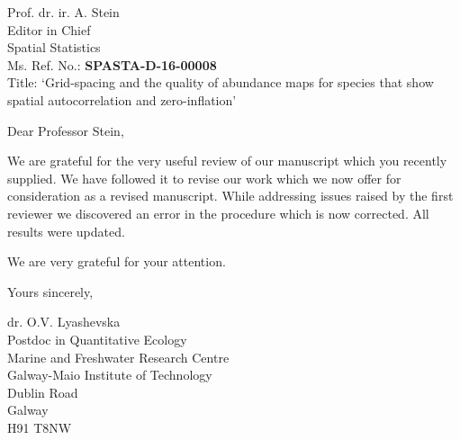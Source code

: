 \documentclass{letter}
\begin{document}
\begin{letter}{
Prof. dr. ir. A. Stein\\
Editor in Chief\\
Spatial Statistics\\
        
\vspace{1cm}
Ms. Ref. No.:  \textbf{SPASTA-D-16-00008}\\
Title: `Grid-spacing and the quality of abundance maps for species that show spatial autocorrelation and zero-inflation'
}

\opening{Dear Professor Stein,}

We are grateful for the very useful review of our manuscript which you recently supplied. We have followed it to revise our work which we now offer for consideration as a revised manuscript. 
While addressing issues raised by the first reviewer we discovered an error in the procedure which is now corrected. All results were updated. 

We are very grateful for your attention.

Yours sincerely, 

dr. O.V. Lyashevska\\
Postdoc in Quantitative Ecology \\
Marine and Freshwater Research Centre\\
Galway-Maio Institute of Technology\\
Dublin Road\\
Galway\\
H91 T8NW

\end{letter}
\end{document}
